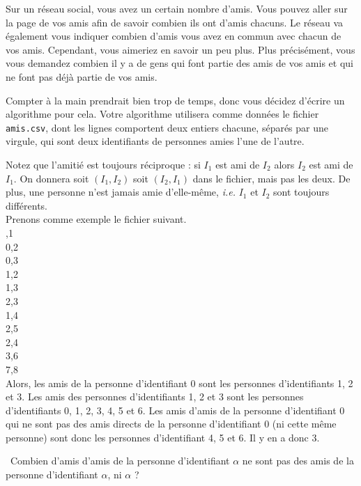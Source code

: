 Sur un réseau social, vous avez un certain nombre d'amis. Vous pouvez aller sur la page de vos amis afin de savoir combien ils 
ont d'amis chacuns. Le réseau va également vous indiquer combien d'amis vous avez en commun avec chacun de vos amis. 
Cependant, vous aimeriez en savoir un peu plus. Plus précisément, vous vous demandez combien il y a de gens qui font 
partie des amis de vos amis et qui ne font pas déjà partie de vos amis. 

Compter à la main prendrait bien trop de temps, donc vous décidez d'écrire un algorithme pour cela. 
Votre algorithme utilisera comme données le fichier \texttt{amis.csv}, dont les lignes comportent deux entiers chacune, séparés par une  virgule, qui sont deux identifiants de personnes amies l'une de l'autre.


Notez que l'amitié est toujours réciproque : si $I_1$ est ami de $I_2$ alors $I_2$ est ami de $I_1$. On donnera soit 
$(I_1,I_2)$ soit $(I_2,I_1)$ dans le fichier, mais pas les deux.
De plus, une personne n'est jamais amie d'elle-même, \emph{i.e.} $I_1$ et $I_2$ sont toujours différents. \\

Prenons comme exemple le fichier suivant.\\

,1\\
0,2\\
0,3\\
1,2\\
1,3\\
2,3\\
1,4\\
2,5\\
2,4\\
3,6\\
7,8\\

Alors, les amis de la personne d'identifiant $0$ sont les personnes d'identifiants 1, 2 et 3. Les amis des personnes d'identifiants 1, 2 et 3 sont les personnes d'identifiants 0, 1, 2, 3, 4, 5 et 6. 
Les amis d'amis de la personne d'identifiant 0 qui ne sont pas des amis directs de la personne 
d'identifiant 0 (ni cette même personne) sont donc les personnes d'identifiant 4, 5 et 6. Il y en a donc 3.

\medskip

\question\ Combien d'amis d'amis de la personne d'identifiant $\alpha$ ne sont pas des amis de la personne d'identifiant $\alpha$, ni $\alpha$ ?